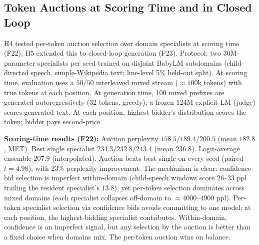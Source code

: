 \subsection{Token Auctions at Scoring Time and in Closed Loop}
\label{sec:results:auction}
\label{sec:auction}
\label{sec:closedloop}

H4 tested per-token auction selection over domain specialists at scoring time (F22); H5 extended this to closed-loop generation (F23). Protocol: two 30M-parameter specialists per seed trained on disjoint BabyLM subdomains (child-directed speech, simple-Wikipedia text; line-level 5\% held-out split). At scoring time, evaluation uses a $50/50$ interleaved mixed stream ($\approx 100$k tokens) with true tokens at each position. At generation time, 100 mixed prefixes are generated autoregressively (32 tokens, greedy); a frozen 124M explicit LM (judge) scores generated text. At each position, highest bidder's distribution scores the token; bidder pays second-price.

\textbf{Scoring-time results (F22):} Auction perplexity $158.5/189.4/200.5$ (mean $182.8$, MET). Best single specialist $234.3/232.8/243.4$ (mean $236.8$). Logit-average ensemble $207.9$ (interpolated). Auction beats best single on every seed (paired $t=4.98$), with 23\% perplexity improvement. The mechanism is clear: confidence-bid selection is imperfect within-domain (child-speech windows score $26$--$33$ ppl trailing the resident specialist's $13.8$), yet per-token selection dominates across mixed domains (each specialist collapses off-domain to $\approx 4000$--$4900$ ppl). Per-token specialist selection via confidence bids avoids committing to one model; at each position, the highest-bidding specialist contributes. Within-domain, confidence is an imperfect signal, but any selection by the auction is better than a fixed choice when domains mix. The per-token auction wins on balance.


